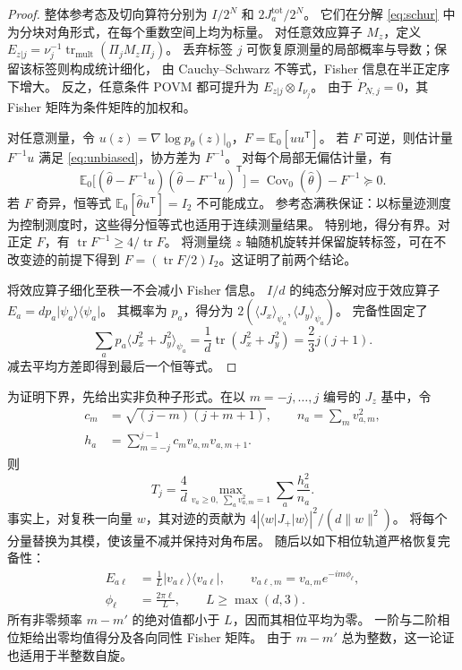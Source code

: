 \documentclass[aps,pra,reprint,superscriptaddress,longbibliography]{revtex4-2}
\theoremstyle{remark}
\DeclareMathOperator{\tr}{tr}
\DeclareMathOperator{\Cov}{Cov}
\newcommand{\E}{\mathbb E}
\newcommand{\norm}[1]{\lVert#1\rVert}
\newcommand{\ket}[1]{\lvert#1\rangle}
\newcommand{\bra}[1]{\langle#1\rvert}
\newcommand{\ip}[1]{\langle#1\rangle}
\begin{document}
\begin{proof}

整体参考态及切向算符分别为 $I/2^N$ 和 $2J_a^{\mathrm{tot}}/2^N$。
它们在分解 \eqref{eq:schur} 中为分块对角形式，在每个重数空间上均为标量。
对任意效应算子 $M_z$，定义
$E_{z|j}=\nu_j^{-1}\tr_{\mathrm{mult}}(\Pi_jM_z\Pi_j)$。
丢弃标签 $j$ 可恢复原测量的局部概率与导数；保留该标签则构成统计细化，
由 Cauchy--Schwarz 不等式，Fisher 信息在半正定序下增大。
反之，任意条件 POVM 都可提升为 $E_{z|j}\otimes I_{\nu_j}$。
由于 $\dot P_{N,j}=0$，其 Fisher 矩阵为条件矩阵的加权和。

对任意测量，令 $u(z)=\nabla\log p_\theta(z)|_0$，$F=\E_0[uu^{\mathsf T}]$。
若 $F$ 可逆，则估计量 $F^{-1}u$ 满足 \eqref{eq:unbiased}，协方差为 $F^{-1}$。
对每个局部无偏估计量，有
\[
 \E_0\bigl[(\widehat\theta-F^{-1}u)
 (\widehat\theta-F^{-1}u)^{\mathsf T}\bigr]
 =\Cov_0(\widehat\theta)-F^{-1}\succeq0.
\]
若 $F$ 奇异，恒等式 $\E_0[\widehat\theta u^{\mathsf T}]=I_2$ 不可能成立。
参考态满秩保证：以标量迹测度为控制测度时，这些得分恒等式也适用于连续测量结果。
特别地，得分有界。对正定 $F$，有 $\tr F^{-1}\geq4/\tr F$。
将测量绕 $z$ 轴随机旋转并保留旋转标签，可在不改变迹的前提下得到
$F=(\tr F/2)I_2$。这证明了前两个结论。

将效应算子细化至秩一不会减小 Fisher 信息。
$I/d$ 的纯态分解对应于效应算子 $E_a=dp_a\ket{\psi_a}\bra{\psi_a}$。
其概率为 $p_a$，得分为 $2(\ip{J_x}_{\psi_a},\ip{J_y}_{\psi_a})$。
完备性固定了
\[
 \sum_a p_a\ip{J_x^2+J_y^2}_{\psi_a}
 =\frac1d\tr(J_x^2+J_y^2)=\frac23j(j+1).
\]
减去平均方差即得到最后一个恒等式。

\end{proof}

为证明下界，先给出实非负种子形式。在以 $m=-j,\ldots,j$ 编号的 $J_z$ 基中，令
\begin{equation}
\begin{aligned}
c_m&=\sqrt{(j-m)(j+m+1)},\qquad
n_a=\sum_m v_{a,m}^2,\\
h_a&=\sum_{m=-j}^{j-1}c_mv_{a,m}v_{a,m+1}.
\end{aligned}
\label{eq:seeds}
\end{equation}
则
\begin{equation}
 T_j=\frac4d\max_{v_a\geq0,\;\sum_a v_{a,m}^2=1}
 \sum_a\frac{h_a^2}{n_a}.
 \label{eq:seed-opt}
\end{equation}
事实上，对复秩一向量 $w$，其对迹的贡献为 $4|\bra wJ_+\ket w|^2/(d\norm w^2)$。
将每个分量替换为其模，使该量不减并保持对角布居。
随后以如下相位轨道严格恢复完备性：
\begin{equation}
\begin{aligned}
E_{a\ell}&=\frac1L\ket{v_{a\ell}}\bra{v_{a\ell}},\qquad
v_{a\ell,m}=v_{a,m}e^{-im\phi_\ell},\\
\phi_\ell&=\frac{2\pi\ell}{L},\qquad L\geq\max(d,3).
\end{aligned}
\label{eq:phase-orbit}
\end{equation}
所有非零频率 $m-m'$ 的绝对值都小于 $L$，因而其相位平均为零。
一阶与二阶相位矩给出零均值得分及各向同性 Fisher 矩阵。
由于 $m-m'$ 总为整数，这一论证也适用于半整数自旋。
\end{document}
